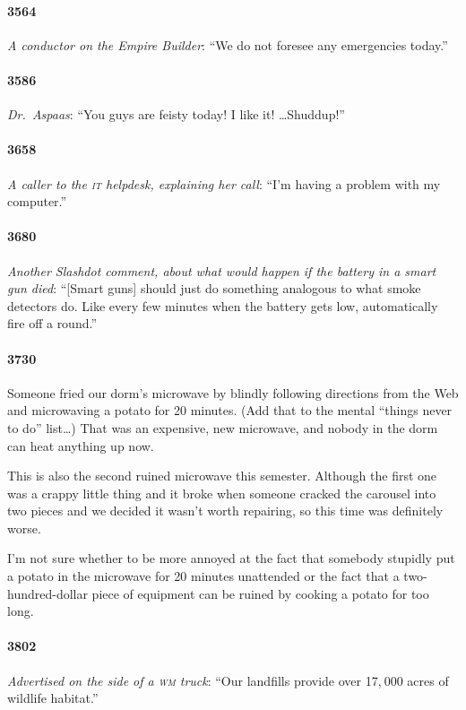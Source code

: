 \documentclass[10pt]{memoir}
\newcommand{\intro}[1]{\emph{#1}}
\begin{document}
\paragraph{3564} \intro{A conductor on the Empire Builder}: ``We do not foresee any emergencies today.''

\paragraph{3586} \intro{Dr.\ Aspaas}: ``You guys are feisty today! I like it! \ldots Shuddup!''

\paragraph{3658} \intro{A caller to the \textsc{it} helpdesk, explaining her call}: ``I'm having a problem with my computer.''

\paragraph{3680} \intro{Another Slashdot comment, about what would happen if the battery in a smart gun died}: ``[Smart guns] should just do something analogous to what smoke detectors do. Like every few minutes when the battery gets low, automatically fire off a round.''

\paragraph{3730} Someone fried our dorm's microwave by blindly following directions from the Web and microwaving a potato for 20 minutes. (Add that to the mental ``things never to do'' list\ldots) That was an expensive, new microwave, and nobody in the dorm can heat anything up now.

This is also the second ruined microwave this semester. Although the first one was a crappy little thing and it broke when someone cracked the carousel into two pieces and we decided it wasn't worth repairing, so this time was definitely worse.

I'm not sure whether to be more annoyed at the fact that somebody stupidly put a potato in the microwave for 20 minutes unattended or the fact that a two-hundred-dollar piece of equipment can be ruined by cooking a potato for too long.

\paragraph{3802} \intro{Advertised on the side of a \textsc{wm} truck}: ``Our landfills provide over 17,$\:\!$000 acres of wildlife habitat.''
\end{document}
